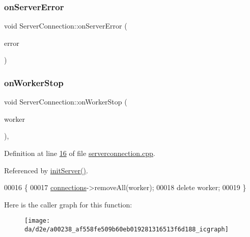 \subsubsection{\texorpdfstring{on\+Server\+Error}{onServerError}}
{\footnotesize\ttfamily void Server\+Connection\+::on\+Server\+Error (\begin{DoxyParamCaption}\item[{\hyperlink{a00131_a65727a063024ff0dedf1ac2f087f4165}{server\+Error}}]{error }\end{DoxyParamCaption})\hspace{0.3cm}{\ttfamily [signal]}}

\mbox{\label{a00238_af558fe509b60eb019281316513f6d188}} 
\subsubsection{\texorpdfstring{on\+Worker\+Stop}{onWorkerStop}}
{\footnotesize\ttfamily void Server\+Connection\+::on\+Worker\+Stop (\begin{DoxyParamCaption}\item[{\hyperlink{a00242}{Server\+Worker} $\ast$}]{worker }\end{DoxyParamCaption})\hspace{0.3cm}{\ttfamily [protected]}, {\ttfamily [slot]}}



Definition at line \hyperlink{a00128_source_l00016}{16} of file \hyperlink{a00128_source}{serverconnection.\+cpp}.



Referenced by \hyperlink{a00290_source_l00020}{init\+Server()}.


\begin{DoxyCode}
00016                                                         \{
00017   \hyperlink{a00238_a7d9e1b1ac7c2d57b439ab5918e7c31d0}{connections}->removeAll(worker);
00018   \textcolor{keyword}{delete} worker;
00019 \}
\end{DoxyCode}
Here is the caller graph for this function\+:
\nopagebreak
\begin{figure}[H]
\begin{center}
\leavevmode
\texttt{[image: da/d2e/a00238\_af558fe509b60eb019281316513f6d188\_icgraph]}
\end{center}
\end{figure}
\mbox{\label{a00238_a26c5b969c3e5151033673e2bcce5ed4a}} 
